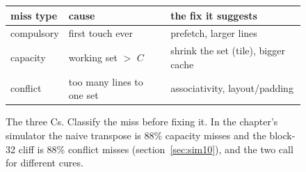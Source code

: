 \begin{figure}[htbp]
\centering
\begin{tabular}{lll}
\toprule
miss type & cause & the fix it suggests \\
\midrule
compulsory & first touch ever & prefetch, larger lines \\
capacity   & working set $>$ $C$ & shrink the set (tile), bigger cache \\
conflict   & too many lines to one set & associativity, layout/padding \\
\bottomrule
\end{tabular}
\caption{The three Cs. Classify the miss before fixing it. In the
chapter's simulator the naive transpose is 88\% capacity misses and the
block-32 cliff is 88\% conflict misses (section~\ref{sec:sim10}), and the
two call for different cures.}
\label{fig:threecs10}
\end{figure}
